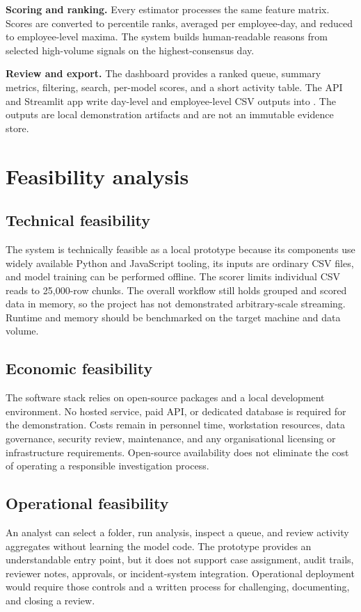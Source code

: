 \textbf{Scoring and ranking.} Every estimator processes the same
feature matrix. Scores are converted to percentile ranks, averaged per
employee-day, and reduced to employee-level maxima. The system builds
human-readable reasons from selected high-volume signals on the
highest-consensus day.

\textbf{Review and export.} The dashboard provides a ranked queue,
summary metrics, filtering, search, per-model scores, and a short
activity table. The API and Streamlit app write day-level and
employee-level CSV outputs into . The outputs are
local demonstration artifacts and are not an immutable evidence store.

\section{Feasibility analysis}

\subsection{Technical feasibility}
The system is technically feasible as a local prototype because its
components use widely available Python and JavaScript tooling, its
inputs are ordinary CSV files, and model training can be performed
offline. The scorer limits individual CSV reads to 25,000-row chunks.
The overall workflow still holds grouped and scored data in memory, so
the project has not demonstrated arbitrary-scale streaming. Runtime
and memory should be benchmarked on the target machine and data volume.

\subsection{Economic feasibility}
The software stack relies on open-source packages and a local
development environment. No hosted service, paid API, or dedicated
database is required for the demonstration. Costs remain in personnel
time, workstation resources, data governance, security review,
maintenance, and any organisational licensing or infrastructure
requirements. Open-source availability does not eliminate the cost of
operating a responsible investigation process.

\subsection{Operational feasibility}
An analyst can select a folder, run analysis, inspect a queue, and
review activity aggregates without learning the model code. The
prototype provides an understandable entry point, but it does not
support case assignment, audit trails, reviewer notes, approvals, or
incident-system integration. Operational deployment would require
those controls and a written process for challenging, documenting, and
closing a review.

